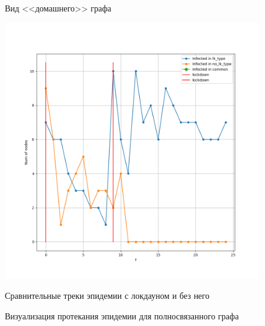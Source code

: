 \begin{figure}[h]
\begin{center}
\begin{minipage}{0.49\linewidth}
			\centering
			Вид <<домашнего>> графа
		\end{minipage}
		\end{center}
	
		\begin{center}
			\begin{minipage}{0.49\linewidth}
				\includegraphics[width=\linewidth, keepaspectratio]{../figs/evidence2/tracks}
				
				\centering
				Сравнительные треки эпидемии с локдауном и без него
			\end{minipage}
		\end{center}
	
		\caption{Визуализация протекания эпидемии для полносвязанного графа}\label{pic:evidence_1}
	\end{figure}

